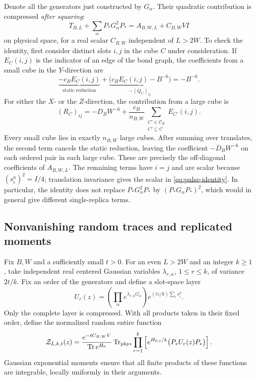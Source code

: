 Denote all the generators just constructed by $G_\alpha$.  Their
quadratic contribution is compressed \emph{after squaring}:
\begin{equation}
 T_{B,L}+\sum_\alpha P_*G_\alpha^2P_*
       =A_{B,W,L}+C_{B,W}VI
 \label{eq:pulse-identity}
\end{equation}
on physical space, for a real scalar $C_{B,W}$ independent of $L>2W$.
To check the identity, first consider distinct slots $i,j$ in the cube
$C$ under consideration.  If $E_C(i,j)$
is the indicator of an edge of the bond graph, the coefficients from
a small cube in the $Y$-direction are
\[
 \underbrace{-c_BE_C(i,j)}_{\text{static reduction}}
 +\underbrace{\bigl(c_BE_C(i,j)-B^{-6}\bigr)}_{-(Q_C)_{ij}}
 =-B^{-6}.
\]
For either the $X$- or the $Z$-direction, the contribution from a large
cube is
\[
 (R_C)_{ij}=-D_BW^{-6}
       +\frac{c_B}{n_{B,W}}
          \sum_{\substack{C'\in\mathcal C_B\\C'\subseteq C}}E_{C'}(i,j).
\]
Every small cube lies in exactly $n_{B,W}$ large cubes.  After summing
over translates, the second term cancels the static reduction, leaving
the coefficient $-D_BW^{-6}$ on each ordered pair in each large cube.
These are precisely the off-diagonal coefficients of $A_{B,W,L}$.
The remaining terms have $i=j$ and are scalar because
$(s_i^a)^2=I/4$; translation invariance gives the scalar in
\eqref{eq:pulse-identity}.  In particular, the identity does not replace
$P_*G_\alpha^2P_*$ by $(P_*G_\alpha P_*)^2$, which would in general
give different single-replica terms.

\subsection{Nonvanishing random traces and replicated moments}

Fix $B,W$ and a sufficiently small $t>0$.  For an even $L>2W$ and an
integer $k\ge1$, take independent real centered Gaussian variables
$\lambda_{r,\alpha}$, $1\le r\le k$, of variance $2t/k$.  Fix an order
of the generators and define a slot-space layer
\[
 U_r(z)=\left(\prod_\alpha e^{\lambda_{r,\alpha}G_\alpha}\right)
                       e^{(tz/k)\sum_i s_i^2}.
\]
Only the complete layer is compressed.  With all products taken in
their fixed order, define the normalized random entire function
\begin{equation}
 \mathcal Z_{L,k,t}(z)=
 \frac{e^{-tC_{B,W}V}}{\operatorname{Tr} e^{H_0}}
 \operatorname{Tr}_{\rm phys}\prod_{r=1}^k
       \left[e^{H_{0,t}/k}\bigl(P_*U_r(z)P_*\bigr)\right].
 \label{eq:random-partition}
\end{equation}
Gaussian exponential moments ensure that all finite products of these
functions are integrable, locally uniformly in their arguments.

